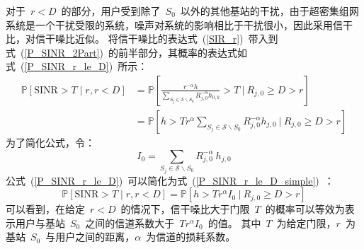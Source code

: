 对于~$r < D$~的部分，用户受到除了~$S_0$~以外的其他基站的干扰，由于超密集组网系统是一个干扰受限的系统，噪声对系统的影响相比于干扰很小，因此采用信干比，对信干噪比近似。
将信干噪比的表达式~(\ref{SIR_r})~带入到式~(\ref{P_SINR_2Part})~的前半部分，其概率的表达式如式~(\ref{P_SINR_r_le_D})~所示：
\begin{equation}\label{P_SINR_r_le_D}
  \begin{aligned}
  \mathbb{P}[\mathrm{SINR}>T \mid r, r < D] & = \mathbb{P}\left[\frac{r^{-\alpha} h}{\sum\limits_{S_j\in \mathcal{S}\backslash S_0} {R_{j,0}^{-\alpha} h_{0,k}}} > T~\bigg|~ R_{j,0} \geq D > r\right]\\
                                            & = \mathbb{P}\left[h > T r ^ \alpha \sum\limits_{S_j\in \mathcal{S}\backslash S_0} {R_{j,0}^{-\alpha} h_{j,0}}~\bigg|~ R_{j,0} \geq D > r \right]
  \end{aligned}
\end{equation}
为了简化公式，令：
\begin{equation}\label{I_define}
  I_0 = \sum\limits_{S_j\in \mathcal{S}\backslash S_0} {R_{j,0}^{-\alpha} ~ h_{j,0}}
\end{equation}
公式~(\ref{P_SINR_r_le_D})~可以简化为式~(\ref{P_SINR_r_le_D_simple})~：
\begin{equation}\label{P_SINR_r_le_D_simple}
  \mathbb{P}[\mathrm{SINR}>T \mid r, r < D] = \mathbb{P}\left[h > T r ^ \alpha I_0 ~\big|~ R_{j,0} \geq D > r \right]
\end{equation}
可以看到，在给定~$r<D$~的情况下，信干噪比大于门限~$T$~的概率可以等效为表示用户与基站~$S_0$~之间的信道系数大于~$Tr^{\alpha}I_0$~的值。
其中~$T$~为给定门限，$r$~为基站~$S_0$~与用户之间的距离，$\alpha$~为信道的损耗系数。

